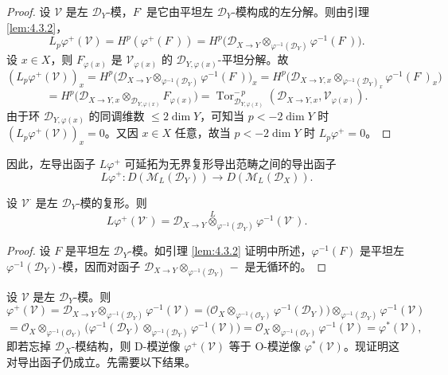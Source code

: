 \begin{proof}
设 $\mathcal{V}$ 是左 $\mathcal{D}_Y$-模，$F^\cdot$ 是它由平坦左 $\mathcal{D}_Y$-模构成的左分解。则由引理 \ref{lem:4.3.2}，
$$L_p\varphi^+(\mathcal{V})=H^p(\varphi^+(F^\cdot))
=H^p\bigl(\mathcal{D}_{X\to Y}\otimes_{\varphi^{-1}(\mathcal{D}_Y)}\varphi^{-1}(F^\cdot)\bigr).$$
设 $x\in X$，则 $F_{\varphi(x)}^\cdot$ 是 $\mathcal{V}_{\varphi(x)}$ 的 $\mathcal{D}_{Y,\varphi(x)}$-平坦分解。故
$$(L_p\varphi^+(\mathcal{V}))_x
=H^p\bigl(\mathcal{D}_{X\to Y}\otimes_{\varphi^{-1}(\mathcal{D}_Y)}\varphi^{-1}(F^\cdot)\bigr)_x
=H^p\bigl(\mathcal{D}_{X\to Y,x}\otimes_{\varphi^{-1}(\mathcal{D}_Y)_x}\varphi^{-1}(F^\cdot)_x\bigr)$$
$$=H^p\bigl(\mathcal{D}_{X\to Y,x}\otimes_{\mathcal{D}_{Y,\varphi(x)}}F_{\varphi(x)}^\cdot\bigr)
=\operatorname{Tor}^{-\,p}_{\mathcal{D}_{Y,\varphi(x)}}(\mathcal{D}_{X\to Y,x},\mathcal{V}_{\varphi(x)}).$$
由于环 $\mathcal{D}_{Y,\varphi(x)}$ 的同调维数 $\le 2\dim Y$，可知当 $p<-2\dim Y$ 时
$(L_p\varphi^+(\mathcal{V}))_x=0$。又因 $x\in X$ 任意，故当 $p<-2\dim Y$ 时 $L_p\varphi^+=0$。
\end{proof}

因此，左导出函子 $L\varphi^+$ 可延拓为无界复形导出范畴之间的导出函子
$$L\varphi^+:D(\mathcal{M}_L(\mathcal{D}_Y))\longrightarrow D(\mathcal{M}_L(\mathcal{D}_X)).$$

\begin{lemma}\label{lem:4.3.4}
设 $\mathcal{V}^\cdot$ 是左 $\mathcal{D}_Y$-模的复形。则
$$L\varphi^+(\mathcal{V}^\cdot)=\mathcal{D}_{X\to Y}\overset{L}{\otimes}_{\varphi^{-1}(\mathcal{D}_Y)}\varphi^{-1}(\mathcal{V}^\cdot).$$
\end{lemma}

\begin{proof}
设 $F$ 是平坦左 $\mathcal{D}_Y$-模。如引理 \ref{lem:4.3.2} 证明中所述，$\varphi^{-1}(F)$ 是平坦左
$\varphi^{-1}(\mathcal{D}_Y)$-模，因而对函子 $\mathcal{D}_{X\to Y}\otimes_{\varphi^{-1}(\mathcal{D}_Y)}-$ 是无循环的。
\end{proof}

设 $\mathcal{V}$ 是左 $\mathcal{D}_Y$-模。则
$$\varphi^+(\mathcal{V})=\mathcal{D}_{X\to Y}\otimes_{\varphi^{-1}(\mathcal{D}_Y)}\varphi^{-1}(\mathcal{V})
=\bigl(\mathcal{O}_X\otimes_{\varphi^{-1}(\mathcal{O}_Y)}\varphi^{-1}(\mathcal{D}_Y)\bigr)
\otimes_{\varphi^{-1}(\mathcal{D}_Y)}\varphi^{-1}(\mathcal{V})$$
$$=\mathcal{O}_X\otimes_{\varphi^{-1}(\mathcal{O}_Y)}
\bigl(\varphi^{-1}(\mathcal{D}_Y)\otimes_{\varphi^{-1}(\mathcal{D}_Y)}\varphi^{-1}(\mathcal{V})\bigr)
=\mathcal{O}_X\otimes_{\varphi^{-1}(\mathcal{O}_Y)}\varphi^{-1}(\mathcal{V})=\varphi^*(\mathcal{V}),$$
即若忘掉 $\mathcal{D}_X$-模结构，则 D-模逆像 $\varphi^+(\mathcal{V})$ 等于 O-模逆像 $\varphi^*(\mathcal{V})$。现证明这对导出函子仍成立。先需要以下结果。

